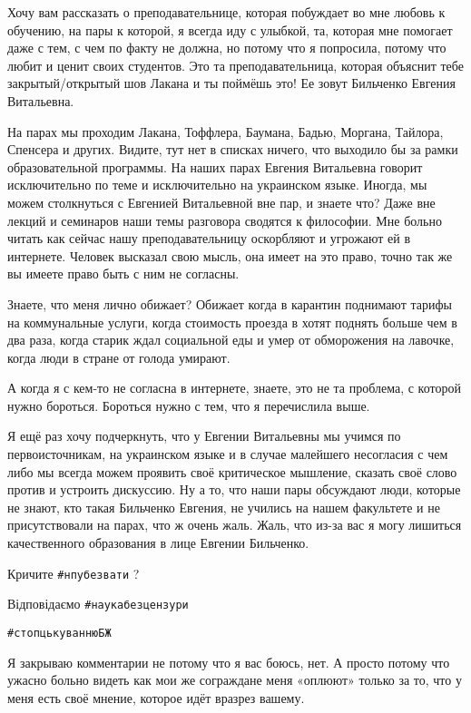 Хочу вам рассказать о преподавательнице, которая побуждает во мне любовь к
обучению, на пары к которой, я всегда иду с улыбкой, та, которая мне помогает
даже с тем, с чем по факту не должна, но потому что я попросила, потому что
любит и ценит своих студентов. Это та преподавательница, которая объяснит тебе
закрытый/открытый шов Лакана и ты поймёшь это! Ее зовут Бильченко Евгения
Витальевна. 

На парах мы проходим Лакана, Тоффлера, Баумана, Бадью, Моргана, Тайлора,
Спенсера и других. Видите, тут нет в списках ничего, что выходило бы за рамки
образовательной программы. На наших парах Евгения Витальевна говорит
исключительно по теме и исключительно на украинском языке. Иногда, мы можем
столкнуться с Евгенией Витальевной вне пар, и знаете что? Даже вне лекций и
семинаров наши темы разговора сводятся к философии. Мне больно читать как
сейчас нашу преподавательницу оскорбляют и угрожают ей в интернете. Человек
высказал свою мысль, она имеет на это право, точно так же вы имеете право быть
с ним не согласны.

Знаете, что меня лично обижает? Обижает когда в карантин поднимают тарифы на
коммунальные услуги, когда стоимость проезда в хотят поднять больше чем в два
раза, когда старик ждал социальной еды и умер от обморожения на лавочке, когда
люди в стране от голода умирают.  

А когда я с кем-то не согласна в интернете, знаете, это не та проблема, с
которой нужно бороться. Бороться нужно с тем, что я перечислила выше. 

Я ещё раз хочу подчеркнуть, что у Евгении Витальевны мы учимся по
первоисточникам, на украинском языке и в случае малейшего несогласия с чем либо
мы всегда можем проявить своё критическое мышление, сказать своё слово против и
устроить дискуссию. Ну а то, что наши пары обсуждают люди, которые не знают,
кто такая Бильченко Евгения, не учились на нашем факультете и не присутствовали
на парах, что ж очень жаль. Жаль, что из-за вас я могу лишиться качественного
образования в лице Евгении Бильченко. 

Кричите \verb|#нпубезвати| ? 

Відповідаємо \verb|#наукабезцензури| 

\verb|#стопцькуваннюБЖ|

Я закрываю комментарии не потому что я вас боюсь, нет. А просто потому что
ужасно больно видеть как мои же сограждане меня «оплюют» только за то, что у
меня есть своё мнение, которое идёт вразрез вашему.




